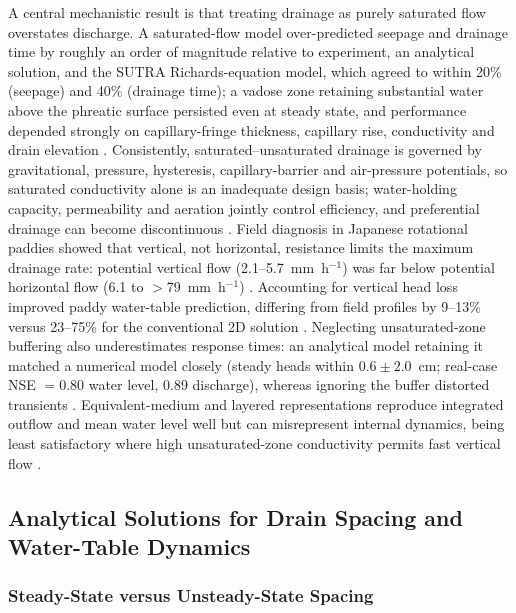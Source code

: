 A central mechanistic result is that treating drainage as purely saturated flow overstates discharge. A saturated-flow model over-predicted seepage and drainage time by roughly an order of magnitude relative to experiment, an analytical solution, and the SUTRA Richards-equation model, which agreed to within 20\% (seepage) and 40\% (drainage time); a vadose zone retaining substantial water above the phreatic surface persisted even at steady state, and performance depended strongly on capillary-fringe thickness, capillary rise, conductivity and drain elevation \parencite{Xin2016b}. Consistently, saturated--unsaturated drainage is governed by gravitational, pressure, hysteresis, capillary-barrier and air-pressure potentials, so saturated conductivity alone is an inadequate design basis; water-holding capacity, permeability and aeration jointly control efficiency, and preferential drainage can become discontinuous \parencite{Li2021}. Field diagnosis in Japanese rotational paddies showed that vertical, not horizontal, resistance limits the maximum drainage rate: potential vertical flow (2.1--5.7~mm~h$^{-1}$) was far below potential horizontal flow (6.1 to $>$79~mm~h$^{-1}$) \parencite{Nishida2020}. Accounting for vertical head loss improved paddy water-table prediction, differing from field profiles by 9--13\% versus 23--75\% for the conventional 2D solution \parencite{Talukolaee2022}. Neglecting unsaturated-zone buffering also underestimates response times: an analytical model retaining it matched a numerical model closely (steady heads within $0.6\pm2.0$~cm; real-case NSE $=0.80$ water level, 0.89 discharge), whereas ignoring the buffer distorted transients \parencite{VandeCraats2021}. Equivalent-medium and layered representations reproduce integrated outflow and mean water level well but can misrepresent internal dynamics, being least satisfactory where high unsaturated-zone conductivity permits fast vertical flow \parencite{Carlier2007}.

\subsection{Analytical Solutions for Drain Spacing and Water-Table Dynamics}

\subsubsection{Steady-State versus Unsteady-State Spacing}

